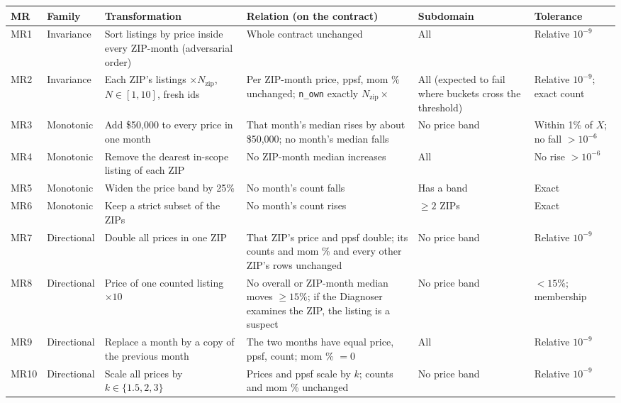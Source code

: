 \documentclass[11pt,a4paper]{article}
\begin{document}
\begin{table}[p]
\centering\scriptsize
\begin{tabularx}{\textwidth}{@{}L{0.6cm}L{1.3cm}L{2.7cm}XL{2.1cm}L{2.2cm}@{}}
\toprule
MR & Family & Transformation & Relation (on the contract) & Subdomain & Tolerance \\
\midrule
MR1 & Invariance & Sort listings by price inside every ZIP-month (adversarial order) & Whole contract unchanged & All & Relative $10^{-9}$ \\
MR2 & Invariance & Each ZIP's listings $\times N_{\text{zip}}$, $N\in[1,10]$, fresh ids & Per ZIP-month price, ppsf, mom \% unchanged; \texttt{n\_own} exactly $N_{\text{zip}}\times$ & All (expected to fail where buckets cross the threshold) & Relative $10^{-9}$; exact count \\
MR3 & Monotonic & Add \$50,000 to every price in one month & That month's median rises by about \$50,000; no month's median falls & No price band & Within 1\% of $X$; no fall $>10^{-6}$ \\
MR4 & Monotonic & Remove the dearest in-scope listing of each ZIP & No ZIP-month median increases & All & No rise $>10^{-6}$ \\
MR5 & Monotonic & Widen the price band by 25\% & No month's count falls & Has a band & Exact \\
MR6 & Monotonic & Keep a strict subset of the ZIPs & No month's count rises & $\ge2$ ZIPs & Exact \\
MR7 & Directional & Double all prices in one ZIP & That ZIP's price and ppsf double; its counts and mom \% and every other ZIP's rows unchanged & No price band & Relative $10^{-9}$ \\
MR8 & Directional & Price of one counted listing $\times10$ & No overall or ZIP-month median moves $\ge15\%$; if the Diagnoser examines the ZIP, the listing is a suspect & No price band & $<15\%$; membership \\
MR9 & Directional & Replace a month by a copy of the previous month & The two months have equal price, ppsf, count; mom \% $=0$ & All & Relative $10^{-9}$ \\
MR10 & Directional & Scale all prices by $k\in\{1.5,2,3\}$ & Prices and ppsf scale by $k$; counts and mom \% unchanged & No price band & Relative $10^{-9}$ \\
\bottomrule
\end{tabularx}


\end{table}
\end{document}
